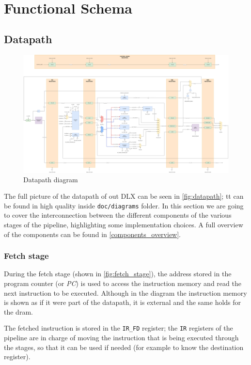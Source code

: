 \chapter{Functional Schema}\label{Functional_Schema}

\section{Datapath}\label{datapathch}

\begin{figure}
    \centering
    \includegraphics[width=1.4\linewidth, angle=-90, origin=c]{images/datapath.png}
    \caption{Datapath diagram}
    \label{fig:datapath}
\end{figure}

The full picture of the datapath of out DLX can be seen in \autoref{fig:datapath}; tt can be found in high quality inside \texttt{doc/diagrams} folder.
In this section we are going to cover the interconnection between the different components of the various stages of the pipeline, highlighting some implementation choices.
A full overview of the components can be found in \autoref{components_overview}.

\subsection{Fetch stage}

During the fetch stage (shown in \autoref{fig:fetch_stage}), the address stored in the program counter (or \textit{PC}) is used to access the instruction memory and read the next instruction to be executed.
Although in the diagram the instruction memory is shown as if it were part of the datapath, it is external and the same holds for the dram. 

The fetched instruction is stored in the \texttt{IR\_FD} register; the \texttt{IR} registers of the pipeline are in charge of moving the instruction that is being executed through the stages, so that it can be used if needed (for example to know the destination register).

